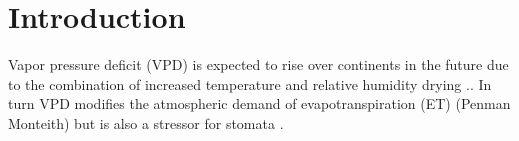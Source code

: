 \documentclass[draft,linenumbers]{agujournal}
\begin{document}

%
% 
% 
% 


\section{Introduction}


Vapor pressure deficit (VPD) is expected to rise over continents in the future due to the combination of increased temperature and relative humidity drying \citep{Byrne_2013}.. In turn VPD modifies the atmospheric demand of evapotranspiration (ET) (Penman Monteith) but is also a stressor for stomata \citep{Leuning_1990, MEDLYN_2011}.
\end{document}

